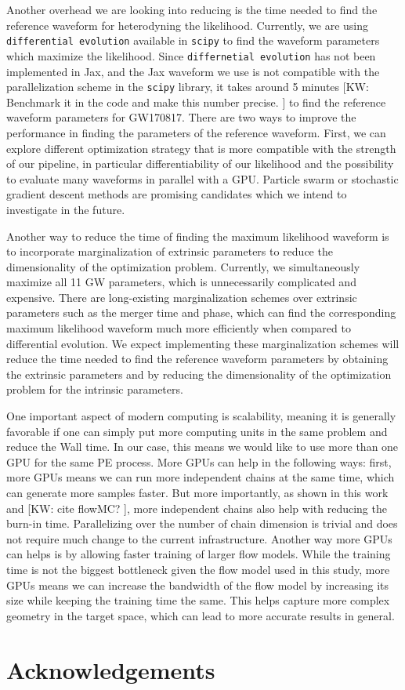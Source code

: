 \documentclass[twocolumn]{aastex631}
\newcommand{\kw}[1]{{\color{rb4}[KW: #1 ]}}
\begin{document}
Another overhead we are looking into reducing is the time needed to find the
reference waveform for heterodyning the likelihood. Currently, we are using
\texttt{differential evolution} available in \texttt{scipy} to find the waveform
parameters which maximize the likelihood. Since \texttt{differnetial evolution}
has not been implemented in Jax, and the Jax waveform we use is not compatible
with the parallelization scheme in the \texttt{scipy} library, it takes around 5
minutes \kw{Benchmark it in the code and make this number precise.} to find the
reference waveform parameters for GW170817. There are two ways to improve the
performance in finding the parameters of the reference waveform. First, we can
explore different optimization strategy that is more compatible with the
strength of our pipeline, in particular differentiability of our likelihood and
the possibility to evaluate many waveforms in parallel with a GPU. Particle
swarm or stochastic gradient descent methods are promising candidates which we
intend to investigate in the future. 

Another way to reduce the time of finding the maximum likelihood waveform is to
incorporate marginalization of extrinsic parameters to reduce the dimensionality
of the optimization problem. Currently, we simultaneously maximize all 11 GW
parameters, which is unnecessarily complicated and expensive. There are
long-existing marginalization schemes over extrinsic parameters such as the merger
time and phase, which can find the corresponding maximum likelihood waveform
much more efficiently when compared to differential evolution. We expect
implementing these marginalization schemes will reduce the time needed to find
the reference waveform parameters by obtaining the extrinsic parameters and by
reducing the dimensionality of the optimization problem for the intrinsic
parameters.

One important aspect of modern computing is scalability, meaning it is generally
favorable if one can simply put more computing units in the same problem and
reduce the Wall time. In our case, this means we would like to use more than one
GPU for the same PE process. More GPUs can help in the following ways: first,
more GPUs means we can run more independent chains at the same time, which can
generate more samples faster. But more importantly, as shown in this work and
\kw{cite flowMC?}, more independent chains also help with reducing the burn-in
time. Parallelizing over the number of chain dimension is trivial and does not
require much change to the current infrastructure. Another way more GPUs can
helps is by allowing faster training of larger flow models. While the training time
is not the biggest bottleneck given the flow model used in this study, more GPUs
means we can increase the bandwidth of the flow model by increasing its size
while keeping the training time the same. This helps capture more complex
geometry in the target space, which can lead to more accurate results in general.


\section{Acknowledgements}


\end{document}
